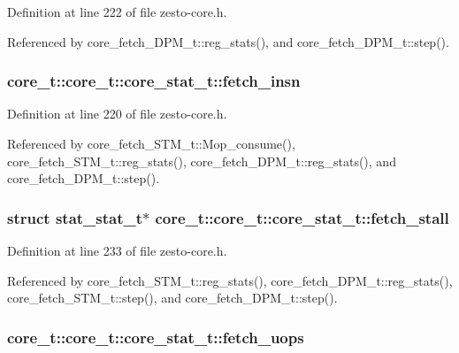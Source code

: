 Definition at line 222 of file zesto-core.h.

Referenced by core\_\-fetch\_\-DPM\_\-t::reg\_\-stats(), and core\_\-fetch\_\-DPM\_\-t::step().
\subsubsection[{fetch\_\-insn}]{ core\_\-t::core\_\-t::core\_\-stat\_\-t::fetch\_\-insn}\label{structcore__t_1_1core__stat__t_3f86f6ee77ffa816fef52f42b3df3ed2}




Definition at line 220 of file zesto-core.h.

Referenced by core\_\-fetch\_\-STM\_\-t::Mop\_\-consume(), core\_\-fetch\_\-STM\_\-t::reg\_\-stats(), core\_\-fetch\_\-DPM\_\-t::reg\_\-stats(), and core\_\-fetch\_\-DPM\_\-t::step().
\subsubsection[{fetch\_\-stall}]{\setlength{\rightskip}{0pt plus 5cm}struct {\bf stat\_\-stat\_\-t}$\ast$ core\_\-t::core\_\-t::core\_\-stat\_\-t::fetch\_\-stall\hspace{0.3cm}{\tt  [read]}}\label{structcore__t_1_1core__stat__t_3cddfe5575dce461b508037a13deae5d}




Definition at line 233 of file zesto-core.h.

Referenced by core\_\-fetch\_\-STM\_\-t::reg\_\-stats(), core\_\-fetch\_\-DPM\_\-t::reg\_\-stats(), core\_\-fetch\_\-STM\_\-t::step(), and core\_\-fetch\_\-DPM\_\-t::step().
\subsubsection[{fetch\_\-uops}]{ core\_\-t::core\_\-t::core\_\-stat\_\-t::fetch\_\-uops}\label{structcore__t_1_1core__stat__t_47b9581190262fa0a7a9c7d18173d502}




